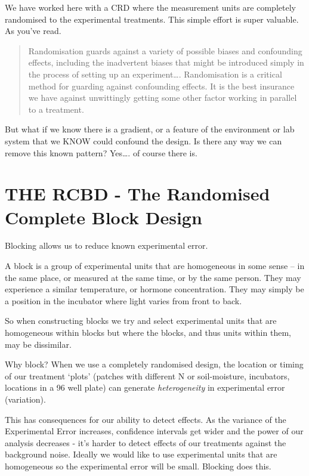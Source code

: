 \documentclass[
]{book}
\begin{document}
We have worked here with a CRD where the measurement units are completely randomised to the experimental treatments. This simple effort is super valuable. As you've read.

\begin{quote}
Randomisation guards against a variety of possible biases and confounding effects, including the inadvertent biases that might be introduced simply in the process of setting up an experiment\ldots. Randomisation is a critical method for guarding against confounding effects. It is the best insurance we have against unwittingly getting some other factor working in parallel to a treatment.
\end{quote}

But what if we know there is a gradient, or a feature of the environment or lab system that we KNOW could confound the design. Is there any way we can remove this known pattern? Yes\ldots. of course there is.

\section{THE RCBD - The Randomised Complete Block Design}\label{the-rcbd---the-randomised-complete-block-design}

Blocking allows us to reduce known experimental error.

A block is a group of experimental units that are homogeneous in some sense -- in the same place, or measured at the same time, or by the same person. They may experience a similar temperature, or hormone concentration. They may simply be a position in the incubator where light varies from front to back.

So when constructing blocks we try and select experimental units that are homogeneous within blocks but where the blocks, and thus units within them, may be dissimilar.

Why block? When we use a completely randomised design, the location or timing of our treatment `plots' (patches with different N or soil-moisture, incubators, locations in a 96 well plate) can generate \emph{heterogeneity} in experimental error (variation).

This has consequences for our ability to detect effects. As the variance of the Experimental Error increases, confidence intervals get wider and the power of our analysis decreases - it's harder to detect effects of our treatments against the background noise. Ideally we would like to use experimental units that are homogeneous so the experimental error will be small. Blocking does this.
\end{document}

